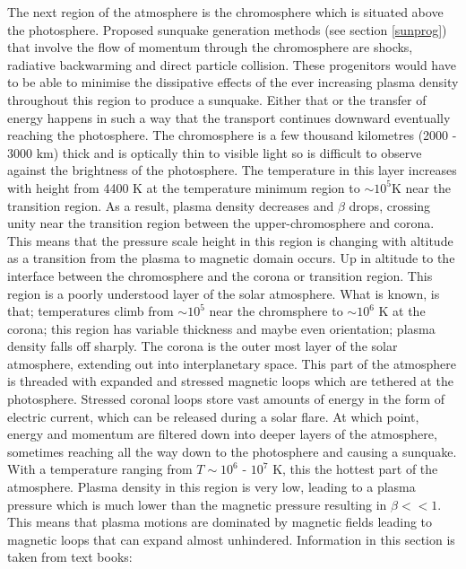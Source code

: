 The next region of the atmosphere is the chromosphere which is situated above the photosphere. Proposed sunquake generation methods (see section \ref{sunprog}) that involve the flow of momentum through the chromosphere are shocks, radiative backwarming and direct particle collision. These progenitors would have to be able to minimise the dissipative effects of the ever increasing plasma density throughout this region to produce a sunquake. Either that or the transfer of energy happens in such a way that the transport continues downward eventually reaching the photosphere. The chromosphere is a few thousand kilometres (2000 - 3000 km) thick and is optically thin to visible light so is difficult to observe against the brightness of the photosphere. The temperature in this layer increases with height from 4400 K at the temperature minimum region to $\sim10^{5}$K near the transition region. As a result, plasma density decreases and $\beta$ drops, crossing unity near the transition region between the upper-chromosphere and corona. This means that the pressure scale height in this region is changing with altitude as a transition from the plasma to magnetic domain occurs. Up in altitude to the interface between the chromosphere and the corona or transition region. This region is a poorly understood layer of the solar atmosphere. What is known, is that; temperatures climb from $\sim10^{5}$ near the chromsphere to $\sim10^{6}$ K at the corona; this region has variable thickness and maybe even orientation; plasma density falls off sharply. The corona is the outer most layer of the solar atmosphere, extending out into interplanetary space. This part of the atmosphere is threaded with expanded and stressed magnetic loops which are tethered at the photosphere. Stressed coronal loops store vast amounts of energy in the form of electric current, which can be released during a solar flare. At which point, energy and momentum are filtered down into deeper layers of the atmosphere, sometimes reaching all the way down to the photosphere and causing a sunquake. With a temperature ranging from $T\sim10^{6}$ - $10^{7}$ K, this the hottest part of the atmosphere. Plasma density in this region is very low, leading to a plasma pressure which is much lower than the magnetic pressure resulting in $\beta << 1$. This means that plasma motions are dominated by magnetic fields leading to magnetic loops that can expand almost unhindered. Information in this section is taken from text books: \cite{2003dysu.book.....D, 2004soas.book.....F}


